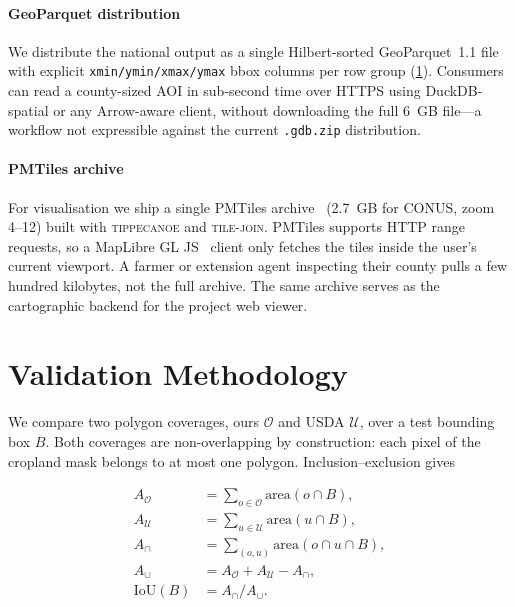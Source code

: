 \documentclass[preprint,12pt]{elsarticle}
\begin{document}
\paragraph{GeoParquet distribution} We distribute the national output
as a single Hilbert-sorted GeoParquet~1.1 file with explicit
\texttt{xmin/ymin/xmax/ymax} bbox columns per row group
(\cref{sec:val-method}). Consumers can read a county-sized AOI in
sub-second time over HTTPS using DuckDB-spatial or any Arrow-aware
client, without downloading the full 6~GB file---a workflow not
expressible against the current \texttt{.gdb.zip} distribution.

\paragraph{PMTiles archive} For visualisation we ship a single
PMTiles archive~\cite{pmtiles} (2.7~GB for CONUS, zoom 4--12) built
with \textsc{tippecanoe} and \textsc{tile-join}. PMTiles supports HTTP
range requests, so a MapLibre GL JS~\cite{maplibre} client only
fetches the tiles inside the user's current viewport. A farmer or
extension agent inspecting their county pulls a few hundred kilobytes,
not the full archive. The same archive serves as the cartographic
backend for the project web viewer.

\section{Validation Methodology}
\label{sec:val-method}

We compare two polygon coverages, ours $\mathcal{O}$ and USDA
$\mathcal{U}$, over a test bounding box $B$. Both coverages are
non-overlapping by construction: each pixel of the cropland mask
belongs to at most one polygon. Inclusion--exclusion gives

\begin{align}
A_\mathcal{O}    &= \textstyle\sum_{o\in\mathcal{O}} \text{area}(o \cap B), \\
A_\mathcal{U}    &= \textstyle\sum_{u\in\mathcal{U}} \text{area}(u \cap B), \\
A_\cap           &= \textstyle\sum_{(o,u)} \text{area}(o \cap u \cap B), \\
A_\cup           &= A_\mathcal{O} + A_\mathcal{U} - A_\cap, \\
\text{IoU}(B)    &= A_\cap / A_\cup.
\end{align}
\end{document}
